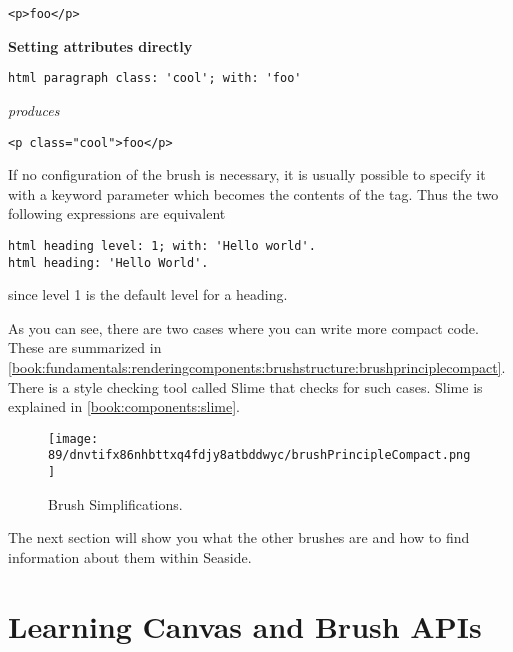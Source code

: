 \documentclass[a4paper,10pt,twoside]{book}
\begin{document}
\begin{lstlisting}
<p>foo</p>
\end{lstlisting}

\textbf{Setting attributes directly}

\begin{lstlisting}
html paragraph class: 'cool'; with: 'foo'
\end{lstlisting}
\textit{produces} 

\begin{lstlisting}
<p class="cool">foo</p>
\end{lstlisting}

If no configuration of the brush is necessary, it is usually possible to specify it with a keyword parameter which becomes the contents of the tag. Thus the two following expressions are equivalent

\begin{lstlisting}
html heading level: 1; with: 'Hello world'.
html heading: 'Hello World'.
\end{lstlisting}

since level 1 is the default level for a heading.

As you can see, there are two cases where you can write more compact code. These are summarized in \autoref{book:fundamentals:renderingcomponents:brushstructure:brushprinciplecompact}. There is a style checking tool called Slime that checks for such cases. Slime is explained in \autoref{book:components:slime}.

\begin{figure}[h!tbp]
	\begin{center}
		\texttt{[image: 89/dnvtifx86nhbttxq4fdjy8atbddwyc/brushPrincipleCompact.png]}
		\caption{Brush Simplifications.\label{book:fundamentals:renderingcomponents:brushstructure:brushprinciplecompact}}
	\end{center}
\end{figure}


The next section will show you what the other brushes are and how to find information about them within Seaside.

\section{Learning Canvas and Brush APIs}
\label{book:fundamentals:renderingcomponents:learningcanvasandbrush}
\end{document}
